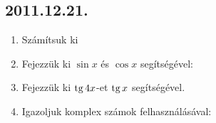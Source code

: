 \subsection*{2011.12.21.}
\begin{enumerate}
\item Számítsuk ki
\item Fejezzük ki $\sin x$ és $\cos x$ segítségével:
\item Fejezzük ki $\mathop{\mathrm{tg}}\nolimits 4x$-et $\mathop{\mathrm{tg}}\nolimits x$ segítségével.
\item Igazoljuk komplex számok felhasználásával:
\end{enumerate}

